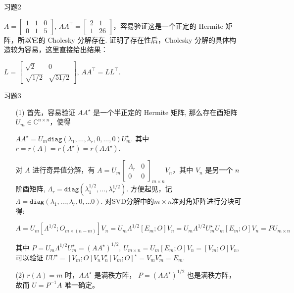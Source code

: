 \documentclass{article}
\begin{document}
\begin{spacing}{1.5}
\begin{enumerate}
        \item [习题2]
    
    $A = \left[\begin{array}{ccc}1&1&0\\0&1&5\end{array}\right]$, $AA^\top = \left[\begin{array}{cc}2&1\\1&26\end{array}\right]$，容易验证这是一个正定的 Hermite 矩阵，所以它的 Cholesky 分解存在. 证明了存在性后，Cholesky 分解的具体构造较为容易，这里直接给出结果：
    
    $L = \left[\begin{array}{cc}\sqrt{2} & 0 \\ \sqrt{1/2} & \sqrt{51/2}\end{array}\right]$, $AA^\top = LL^\top$.

    \item [习题3] 
    
    \begin{itemize}
        \item [(1)] 首先，容易验证 $AA^\star$ 是一个半正定的 Hermite 矩阵, 那么存在酉矩阵$U_m\in\mathbb{C}^{n\times n}$，使得
        
        $AA^\star = U_m \mathtt{diag}(\lambda_1, \dots, \lambda_r, 0, \dots, 0) U_m^\star$. 其中 $r = r(A) = r(A^\star) = r(AA^\star)$. 
        
        对 $A$ 进行奇异值分解，有 $A = U_m\left[\begin{array}{cc}\Lambda_r&0\\0&0\end{array}\right]_{m\times n} V_n$，其中 $V_n$ 是另一个 $n$ 阶酉矩阵, $\Lambda_r = \mathtt{diag}(\lambda_1^{1/2},\dots, \lambda_r^{1/2})$. 方便起见，记 $\Lambda = \mathtt{diag}(\lambda_1, \dots, \lambda_r, 0,\dots 0)$. 对SVD分解中的$m\times n$准对角矩阵进行分块可得: 
        
        $$A = U_m \left[ \Lambda^{1/2} ; O_{m\times (n - m)} \right] V_n = U_m \Lambda^{1/2}\left[E_m; O\right]V_n = U_m \Lambda^{1/2} U_m^\star U_m [E_m; O] V_n = PU_{m\times n} $$

        其中 $P = U_m \Lambda^{1/2} U_m^\star = (AA^\star)^{1/2}$, $U_{m\times n} = U_m [E_m; O] V_n = [V_m; O] V_n$, 可以验证 $U U^\star = [V_m; O] V_n V_n^\star [V_m; O]^\star = V_mV_m^\star = E_m$. 

        \item [(2)] $r(A) = m$ 时，$AA^\star$ 是满秩方阵， $P = (AA^\star)^{1/2}$ 也是满秩方阵，故而 $U = P^{-1}A$ 唯一确定。


\end{itemize}
\end{enumerate}
\end{spacing}
\end{document}
